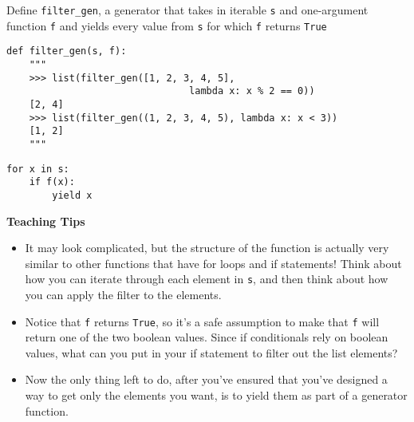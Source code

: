 \begin{blocksection}
\question Define \lstinline$filter_gen$, a generator that takes in iterable \lstinline$s$ and one-argument function  \lstinline$f$ and yields every value
from  \lstinline$s$ for which \lstinline$f$ returns  \lstinline$True$

\begin{lstlisting}
def filter_gen(s, f):
    """
    >>> list(filter_gen([1, 2, 3, 4, 5],
                                lambda x: x % 2 == 0))
    [2, 4]
    >>> list(filter_gen((1, 2, 3, 4, 5), lambda x: x < 3))
    [1, 2]
    """
\end{lstlisting}

\begin{solution}[1.5in]
\begin{lstlisting}
for x in s:
    if f(x):
        yield x
\end{lstlisting}
\end{solution}
\end{blocksection}

\begin{blocksection}
\begin{guide}
\textbf{Teaching Tips}
\begin{itemize}
\item It may look complicated, but the structure of the function is actually very similar to other functions that have for loops and if statements! Think about how you can iterate through each element in \texttt{s}, and then think about how you can apply the filter to the elements.
\item Notice that \texttt{f} returns \texttt{True}, so it's a safe assumption to make that \texttt{f} will return one of the two boolean values. Since if conditionals rely on boolean values, what can you put in your if statement to filter out the list elements?
\item Now the only thing left to do, after you've ensured that you've designed a way to get only the elements you want, is to yield them as part of a generator function.
\end{itemize}
\end{guide}
\end{blocksection}